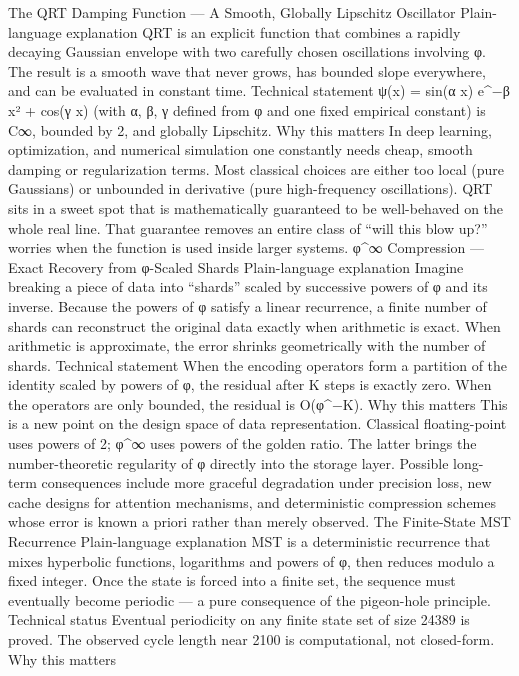 {{{{{{The QRT Damping Function — A Smooth, Globally Lipschitz Oscillator
Plain-language explanation
QRT is an explicit function that combines a rapidly decaying Gaussian envelope with two carefully chosen oscillations involving φ. The result is a smooth wave that never grows, has bounded slope everywhere, and can be evaluated in constant time.
Technical statement
ψ(x) = sin(α x) e^{−β x²} + cos(γ x)
(with α, β, γ defined from φ and one fixed empirical constant) is C∞, bounded by 2, and globally Lipschitz.
Why this matters
In deep learning, optimization, and numerical simulation one constantly needs cheap, smooth damping or regularization terms. Most classical choices are either too local (pure Gaussians) or unbounded in derivative (pure high-frequency oscillations). QRT sits in a sweet spot that is mathematically guaranteed to be well-behaved on the whole real line. That guarantee removes an entire class of “will this blow up?” worries when the function is used inside larger systems.
φ^∞ Compression — Exact Recovery from φ-Scaled Shards
Plain-language explanation
Imagine breaking a piece of data into “shards” scaled by successive powers of φ and its inverse. Because the powers of φ satisfy a linear recurrence, a finite number of shards can reconstruct the original data exactly when arithmetic is exact. When arithmetic is approximate, the error shrinks geometrically with the number of shards.
Technical statement
When the encoding operators form a partition of the identity scaled by powers of φ, the residual after K steps is exactly zero. When the operators are only bounded, the residual is O(φ^{−K}).
Why this matters
This is a new point on the design space of data representation. Classical floating-point uses powers of 2; φ^∞ uses powers of the golden ratio. The latter brings the number-theoretic regularity of φ directly into the storage layer. Possible long-term consequences include more graceful degradation under precision loss, new cache designs for attention mechanisms, and deterministic compression schemes whose error is known a priori rather than merely observed.
The Finite-State MST Recurrence
Plain-language explanation
MST is a deterministic recurrence that mixes hyperbolic functions, logarithms and powers of φ, then reduces modulo a fixed integer. Once the state is forced into a finite set, the sequence must eventually become periodic — a pure consequence of the pigeon-hole principle.
Technical status
Eventual periodicity on any finite state set of size 24389 is proved. The observed cycle length near 2100 is computational, not closed-form.
Why this matters
}}}}}}
